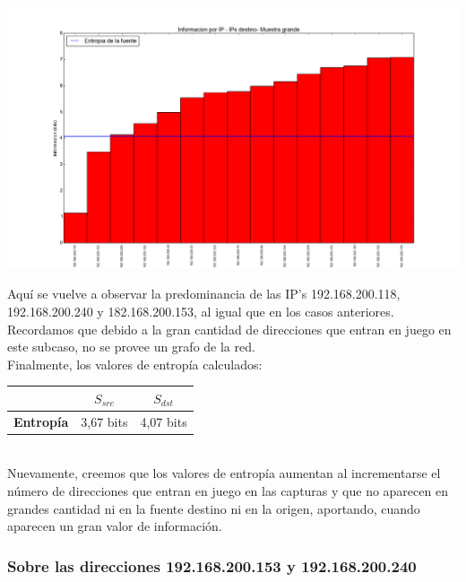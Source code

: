 \includegraphics[scale=0.5,clip=true,trim=100 0 0 0]{graphics/laburo_grande_dst.png}


\indent Aquí se vuelve a observar la predominancia de las IP's 192.168.200.118, 192.168.200.240 y 182.168.200.153, al igual que en los casos anteriores.\\

\indent Recordamos que debido a la gran cantidad de direcciones que entran en juego en este subcaso, no se provee un grafo de la red.\\

\indent Finalmente, los valores de entropía calculados:\\

\begin{centering}
	\begin{tabular}{ | c | c | c |} \hline
	   & \textbf{$S_{src}$} & \textbf{$S_{dst}$} \\ \hline
	  	\textbf{Entropía} & 3,67 bits & 4,07 bits \\ \hline
	\end{tabular}
\end{centering}\\

\indent Nuevamente, creemos que los valores de entropía aumentan al incrementarse el número de direcciones que entran en juego en las capturas y que no aparecen en grandes cantidad ni en la fuente destino ni en la origen, aportando, cuando aparecen un gran valor de información.\\


\subsubsection{Sobre las direcciones 192.168.200.153 y 192.168.200.240}

